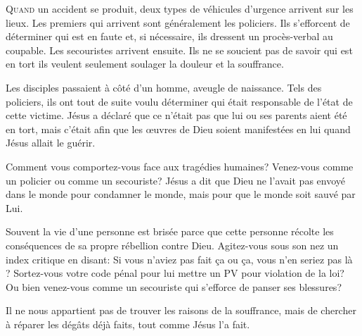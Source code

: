 



\lettrine{Q}{uand} un accident se produit, deux types de véhicules
 d'urgence arrivent sur les lieux. Les premiers qui arrivent
 sont généralement les policiers. Ils s'efforcent de déterminer
 qui est en faute et, si nécessaire, ils dressent un procès-verbal
 au coupable. Les secouristes arrivent ensuite.
 Ils ne se 
 soucient pas de savoir qui est en tort
 \ocadr ils veulent seulement soulager la douleur et la souffrance.

Les disciples passaient à côté d'un homme, aveugle de naissance.
 Tels des policiers, ils ont tout de suite voulu déterminer
 qui était responsable de l'état de cette victime.
 Jésus a déclaré que ce n'était pas que lui ou ses parents aient été en tort,
 mais c'était afin que les \oe{}uvres de Dieu soient manifestées
 en lui quand Jésus allait le guérir.


Comment vous comportez-vous face aux tragédies humaines?
 Venez-vous comme un policier ou comme un secouriste?
 Jésus a dit que Dieu ne l'avait pas envoyé dans le monde
 pour condamner le monde, mais 
 pour que le monde soit sauvé par Lui.

Souvent la vie d'une personne est brisée parce que cette personne
 récolte les conséquences de sa propre rébellion contre Dieu.
 Agitez-vous sous son nez un index critique en disant: 
 \Og Si vous n'aviez pas fait \c{c}a ou \c{c}a, vous n'en seriez pas là \Fg{} ?
 Sortez-vous votre \Og code pénal \Fg{} pour lui mettre un PV
 pour violation de la loi? Ou bien venez-vous comme un secouriste
 qui s'efforce de panser ses blessures?

Il ne nous appartient pas de trouver les raisons de la souffrance,
 mais de chercher à réparer les dégâts déjà faits, tout comme Jésus l'a fait.

